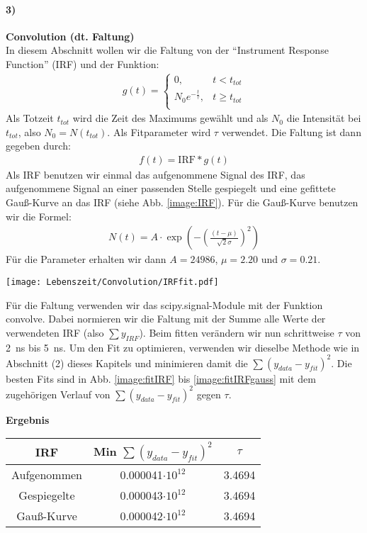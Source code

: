 \paragraph{3)}\textbf{Convolution (dt. Faltung)}\\
In diesem Abschnitt wollen wir die Faltung von der \enquote{Instrument Response Function} (IRF) und der Funktion:
\begin{gather}
    g(t) = 
    \begin{cases}
        0, & t < t_{tot} \\
        N_0 e^{-\frac{t}{\tau}}, & t \geq t_{tot} \\
    \end{cases}
\end{gather}
Als Totzeit $t_{tot}$ wird die Zeit des Maximums gewählt und als $N_0$ die Intensität bei $t_{tot}$, also $N_0 = N(t_{tot})$. Als Fitparameter wird $\tau$ verwendet. Die Faltung ist dann gegeben durch:
\begin{gather}
    f(t) = \text{IRF} * g(t)
\end{gather}
Als IRF benutzen wir einmal das aufgenommene Signal des IRF, das aufgenommene Signal an einer passenden Stelle gespiegelt und eine gefittete Gauß-Kurve an das IRF (siehe Abb. \ref{image:IRF}). Für die Gauß-Kurve benutzen wir die Formel:
\begin{gather}
    N(t) = A \cdot\exp(-\left(\frac{(t-\mu)}{\sqrt{2}\sigma}\right)^2)
\end{gather}
Für die Parameter erhalten wir dann $A = 24986$, $\mu = 2.20$ und $\sigma = 0.21$.
\begin{center}
    \texttt{[image: Lebenszeit/Convolution/IRFfit.pdf]}
    \label{image:IRF}
\end{center}
\newpage
Für die Faltung verwenden wir das scipy.signal-Module mit der Funktion convolve. Dabei normieren wir die Faltung mit der Summe alle Werte der verwendeten IRF (also $\sum y_{IRF}$). Beim fitten verändern wir nun schrittweise $\tau$ von \SI{2}{\nano\second} bis \SI{5}{\nano\second}. Um den Fit zu optimieren, verwenden wir dieselbe Methode wie in Abschnitt (2) dieses Kapitels und minimieren damit die $\sum(y_{data}-y_{fit})^2$. Die besten Fits sind in Abb. \ref{image:fitIRF} bis \ref{image:fitIRFgauss} mit dem zugehörigen Verlauf von $\sum(y_{data}-y_{fit})^2$ gegen $\tau$.
\begin{center}
    \textbf{Ergebnis}\\[0,2cm]
    \begin{tabular}{c | c c}
        IRF & Min $\sum(y_{data}-y_{fit})^2$ & $\tau$ \\
        \hline
        Aufgenommen & 0.000041$\cdot10^{12}$ & 3.4694 \\
        Gespiegelte & 0.000043$\cdot10^{12}$ & 3.4694 \\
        Gauß-Kurve  & 0.000042$\cdot10^{12}$ & 3.4694 \\
    \end{tabular}
\end{center}

